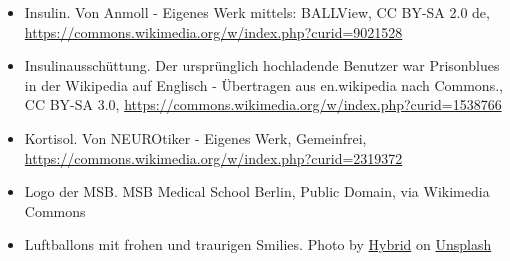 \documentclass{beamer}
\begin{document}
\begin{frame}
\begin{tiny}
\begin{itemize}
\item
Insulin. Von Anmoll - Eigenes Werk mittels: BALLView, CC BY-SA 2.0 de, \url{https://commons.wikimedia.org/w/index.php?curid=9021528}

\item
Insulinausschüttung. Der ursprünglich hochladende Benutzer war Prisonblues in der Wikipedia auf Englisch - Übertragen aus en.wikipedia nach Commons., CC BY-SA 3.0, \url{https://commons.wikimedia.org/w/index.php?curid=1538766}

\item
Kortisol. Von NEUROtiker - Eigenes Werk, Gemeinfrei, \url{https://commons.wikimedia.org/w/index.php?curid=2319372}

\item
Logo der MSB. MSB Medical School Berlin, Public Domain, via Wikimedia Commons


\item
Luftballons mit frohen und traurigen Smilies. Photo by \href{https://unsplash.com/@artbyhybrid?utm_source=unsplash&utm_medium=referral&utm_content=creditCopyText}{Hybrid} on \href{https://unsplash.com/s/photos/feedback?utm_source=unsplash&utm_medium=referral&utm_content=creditCopyText}{Unsplash}
\end{itemize}
\end{tiny}
\end{frame}
\end{document}
